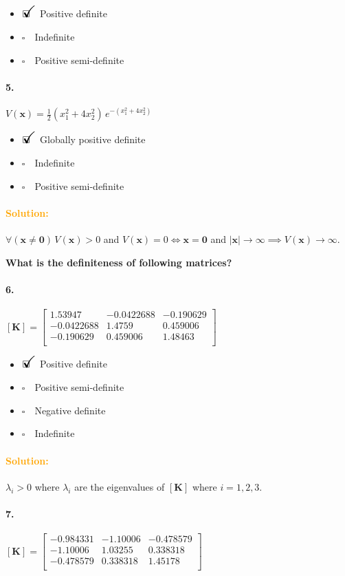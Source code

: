 \documentclass[12pt, a4paper]{article}
\newcommand{\ans}{\item[]$\rlap{\LARGE{\checkmark}}\square\quad$}
\newcommand{\noans}{\item[]$\square\quad$}
\begin{document}
\begin{itemize}
\ans Positive definite
\noans Indefinite
\noans Positive semi-definite
\end{itemize}

\paragraph{5.}
$V(\bm{x}) = \frac{1}{2}(x_{1}^{2}+4x_{2}^{2}) \, e^{-(x_{1}^{2}+4x_{2}^{2})}$

\begin{itemize}
\ans Globally positive definite
\noans Indefinite
\noans Positive semi-definite
\end{itemize}

\paragraph{\textcolor{orange}{Solution:}}$\forall(\bm{x}\neq\bm{0})\,V(\bm{x})>0$ and $V(\bm{x})=0\iff\bm{x}=\bm{0}$ and $|\bm{x}|\rightarrow\infty\implies V{(\bm{x})}\rightarrow\infty$. 

\vspace{2em}
\textbf{What is the definiteness of following matrices?}

\paragraph{6.}
$[\bm{K}] = 
\begin{bmatrix}
1.53947 & -0.0422688 & -0.190629 \\	
-0.0422688 & 1.4759 & 0.459006 \\
-0.190629 & 0.459006 & 1.48463 \\
\end{bmatrix}
$

\begin{itemize}
\ans Positive definite
\noans Positive semi-definite
\noans Negative definite
\noans Indefinite
\end{itemize}

\paragraph{\textcolor{orange}{Solution:}} $\lambda_{i}>0$ where $\lambda_{i}$ are the eigenvalues of $[\bm{K}]$ where $i=1,2,3$.

\paragraph{7.}
$[\bm{K}] = 
\begin{bmatrix}
-0.984331 &  -1.10006 & -0.478579 \\
-1.10006 & 1.03255 & 0.338318 \\
-0.478579 & 0.338318 & 1.45178 \\
\end{bmatrix}
$
\end{document}
